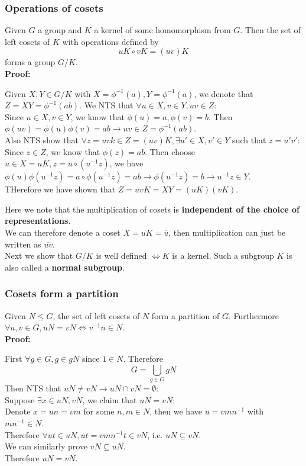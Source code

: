 \documentclass{article}
\begin{document}
\subsubsection*{Operations of cosets}
Given $G$ a group and $K$ a kernel of some homomorphism from $G$. Then the set of left cosets of $K$ with operations defined by
\begin{equation*}
    uK \circ vK = (uv)K
\end{equation*}
forms a group $G/K$.\\
\textbf{Proof:}
\begin{addmargin}[1em]{0em}
    Given $X, Y \in G/K$ with $X = \phi^{-1}(a), Y = \phi^{-1}(a)$, we denote that $Z = XY = \phi^{-1}(ab)$. We NTS that $\forall u \in X, v \in Y, uv \in Z$:\\
    Since $u \in X, v \in Y$, we know that $\phi(u) = a, \phi(v) = b$. Then $\phi(uv) = \phi(u)\phi(v) = ab \rightarrow uv \in Z = \phi^{-1}(ab)$.\\
    Also NTS show that $\forall z = uvk \in Z = (uv)K, \exists u' \in X, v' \in Y$ such that $z = u'v'$:\\
    Since $z \in Z$, we know that $\phi(z) = ab$. Then choose $u \in X = uK, z = u \circ (u^{-1}z)$, we have\\
    $\phi(u)\phi(u^{-1}z) = a \circ \phi(u^{-1}z) = ab \rightarrow \phi(u^{-1}z) = b \rightarrow u^{-1}z \in Y$.\\
    THerefore we have shown that $Z = uvK = XY = (uK)(vK)$.
\end{addmargin}
Here we note that the multiplication of cosets is \textbf{independent of the choice of representations}.\\
We can therefore denote a coset $X = uK = \overline{u}$, then multiplication can just be written as $\overline{uv}$.\\
Next we show that $G/K$ is well defined $\iff K$ is a kernel. Such a subgroup $K$ is also called a \textbf{normal subgroup}.
\subsubsection*{Cosets form a partition}
Given $N \leq G$, the set of left cosets of $N$ form a partition of $G$. Furthermore $\forall u, v \in G, uN = vN \iff v^{-1}n \in N$.\\
\textbf{Proof:}
\begin{addmargin}[1em]{0em}
    First $\forall g \in G, g \in gN$ since $1 \in N$. Therefore
    \begin{equation*}
        G = \bigcup_{g \in G} gN
    \end{equation*}
    Then NTS that $uN \neq vN \rightarrow uN \cap vN = \emptyset$:\\
    Suppose $\exists x \in uN, vN$, we claim that $uN = vN$:\\
    Denote $x = un = vm$ for some $n, m \in N$, then we have $u = vmn^{-1}$ with $mn^{-1} \in N$.\\
    Therefore $\forall ut \in uN, ut = vmn^{-1}t \in vN$, i.e. $uN \subseteq vN$.\\
    We can similarly prove $vN \subseteq uN$.\\
    Therefore $uN = vN$.
\end{addmargin}
\end{document}
